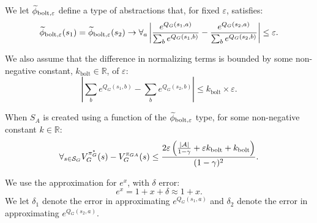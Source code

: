 \bdefn{$\epB$}
We let $\epB$ define a type of abstractions that, for fixed $\varepsilon$, satisfies:
\begin{equation}
\widetilde \phi_{\text{bolt},\varepsilon}(s_1) = \widetilde \phi_{\text{bolt},\varepsilon}(s_2) \rightarrow \forall_{a} \left|\frac{e^{Q_G(s_1,a)}}{\sum_b e^{Q_G(s_1,b)}} - \frac{e^{Q_G(s_2,a)}}{\sum_b e^{Q_G(s_2,b)}}\right| \leq \varepsilon.
\label{eq:phi_bolt}
\end{equation}
\edefn

We also assume that the difference in normalizing terms is bounded by some non-negative constant, $k_{\text{bolt}}  \in \mathbb{R}$, of $\varepsilon$:
\begin{equation}
\left| \sum_b e^{Q_G(s_1,b)} - \sum_b e^{Q_G(s_2,b)} \right| \leq k_{\text{bolt}} \times\varepsilon.
\label{eq:bolt_denom}
\end{equation}
\begin{lma} When $S_A$ is created using a function of the $\epB$ type, for some non-negative constant $k \in \mathbb{R}$:
\begin{equation}
\forall_{s \in \mathcal{S}_G} V_G^{\pi^*_G}(s) - V_G^{\pi_{GA}}(s) \leq \frac{2\varepsilon\left(\frac{|\mathcal{A}|}{1-\gamma} + \varepsilon k_{\text{bolt}}  + k_{\text{bolt}} \right)}{(1-\gamma)^2}.
\end{equation}
\label{lma:bolt_lemma}
\end{lma}
\vspace{-3mm}%
We use the approximation for $e^x$, with $\delta$ error:
\begin{equation}
 e^x = 1 + x + \delta  \approx 1 + x.
\label{eq:e_to_x_approx}
\end{equation}
We let $\delta_1$ denote the error in approximating $e^{Q_G(s_1,a)}$ and $\delta_2$ denote the error in approximating $e^{Q_G(s_2,a)}$. \\

 \\

